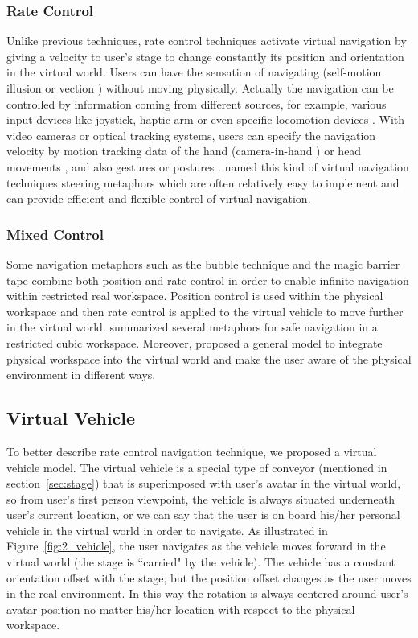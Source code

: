 \subsubsection{Rate Control}
Unlike previous techniques, rate control techniques activate virtual navigation by giving a velocity to user's stage to change constantly its position and orientation in the virtual world. Users can have the sensation of navigating (self-motion illusion or vection \citep{Riecke2012Vection}) without moving physically. Actually the navigation can be controlled by information coming from different sources, for example, various input devices like joystick, haptic arm \citep{Martin2012Forklift} or even specific locomotion devices \citep{Marchal2011JOYMAN}. With video cameras or optical tracking systems, users can specify the navigation velocity by motion tracking data of the hand (camera-in-hand \citep{Ware1990EVC}) or head movements \citep{Bourdot2002HCNav}, and also gestures \citep{Konrad2003Gesture} or postures \citep{Kapri2011Steering}. \citet{Bowman2004UIT} named this kind of virtual navigation techniques steering metaphors which are often relatively easy to implement and can provide efficient and flexible control of virtual navigation.

\subsubsection{Mixed Control}
Some navigation metaphors such as the bubble technique \citep{Dominjon2005Bubble} and the magic barrier tape \citep{Cirio2009MBT} combine both position and rate control in order to enable infinite navigation within restricted real workspace. Position control is used within the physical workspace and then rate control is applied to the virtual vehicle to move further in the virtual world. \citet{Cirio2012Cube} summarized several metaphors for safe navigation in a restricted cubic workspace. Moreover, \citet{Fleury2010Generic} proposed a general model to integrate physical workspace into the virtual world and make the user aware of the physical environment in different ways.


\subsection{Virtual Vehicle}
To better describe rate control navigation technique, we proposed a virtual vehicle model. The virtual vehicle is a special type of conveyor (mentioned in section~\ref{sec:stage}) that is superimposed with user's avatar in the virtual world, so from user's first person viewpoint, the vehicle is always situated underneath user's current location, or we can say that the user is on board his/her personal vehicle in the virtual world in order to navigate. As illustrated in Figure~\ref{fig:2_vehicle}, the user navigates as the vehicle moves forward in the virtual world (the stage is ``carried" by the vehicle). The vehicle has a constant orientation offset with the stage, but the position offset changes as the user moves in the real environment. In this way the rotation is always centered around user's avatar position no matter his/her location with respect to the physical workspace.

